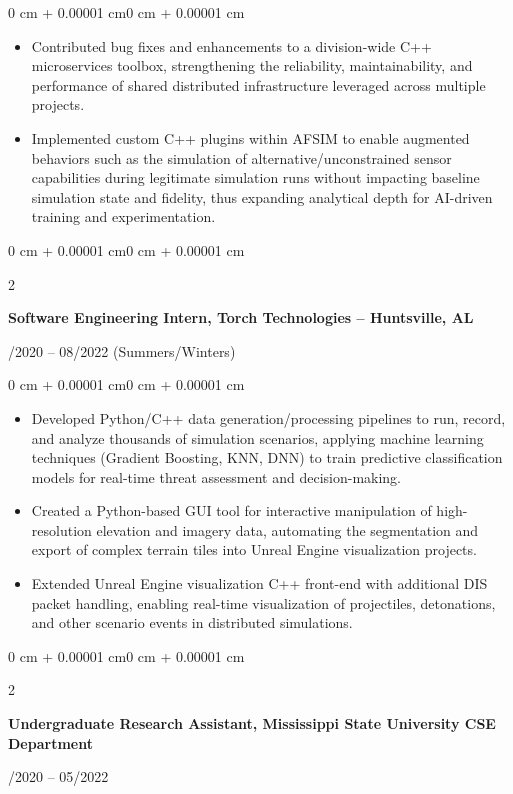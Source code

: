 \documentclass[10pt, letterpaper]{article}
\newenvironment{highlights}{
    \begin{itemize}[
        topsep=0.10 cm,
        parsep=0.10 cm,
        partopsep=0pt,
        itemsep=0pt,
        leftmargin=0.4 cm + 10pt
    ]
}{
    \end{itemize}
}
\newenvironment{onecolentry}{
    \begin{adjustwidth}{0 cm + 0.00001 cm}{0 cm + 0.00001 cm}
}{
    \end{adjustwidth}
}
\newenvironment{twocolentry}[1]{
    \onecolentry
    \def\secondColumn{#1}
    \setcolumnwidth{\fill,4.5cm}
    \begin{paracol}{2}
}{
    \switchcolumn \raggedleft \secondColumn
    \end{paracol}
    \endonecolentry
}
\begin{document}
\begin{onecolentry}
\begin{highlights}
        \item Contributed bug fixes and enhancements to a division-wide C++ microservices toolbox, strengthening the reliability, maintainability, and performance of shared distributed infrastructure leveraged across multiple projects.
        \item Implemented custom C++ plugins within AFSIM to enable augmented behaviors such as the simulation of alternative/unconstrained sensor capabilities during legitimate simulation runs without impacting baseline simulation state and fidelity, thus expanding analytical depth for AI-driven training and experimentation.
    \end{highlights}
\end{onecolentry}

\vspace{0.4cm}

\begin{twocolentry}{05/2020 – 08/2022 (Summers/Winters)}
    \textbf{Software Engineering Intern, Torch Technologies – Huntsville, AL}
\end{twocolentry}

\vspace{0.10 cm}
\begin{onecolentry}
    \begin{highlights}
        \item Developed Python/C++ data generation/processing pipelines to run, record, and analyze thousands of simulation scenarios, applying machine learning techniques (Gradient Boosting, KNN, DNN) to train predictive classification models for real-time threat assessment and decision-making.
        \item Created a Python-based GUI tool for interactive manipulation of high-resolution elevation and imagery data, automating the segmentation and export of complex terrain tiles into Unreal Engine visualization projects.
        \item Extended Unreal Engine visualization C++ front-end with additional DIS packet handling, enabling real-time visualization of projectiles, detonations, and other scenario events in distributed simulations.
    \end{highlights}
\end{onecolentry}

\vspace{0.4 cm}

\begin{twocolentry}{09/2020 – 05/2022}
    \textbf{Undergraduate Research Assistant, Mississippi State University CSE Department}
\end{twocolentry}
\end{document}
